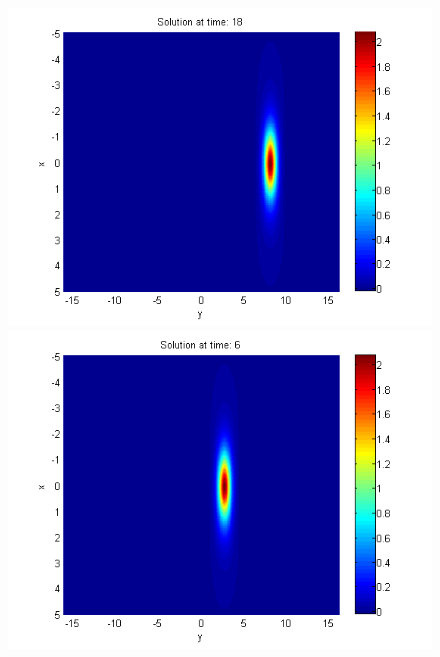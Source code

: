 \documentclass[a4paper]{article}
\theoremstyle{remark}
\begin{document}
\begin{large}
\begin{figure}[ht]
\begin{minipage}[b]{0.48\linewidth}
	\end{minipage}	
	\begin{minipage}[b]{0.48\linewidth}
		\raggedright
		\includegraphics[width=\linewidth]{../amitans/figures/solution_30x45_bt3_c045_T18.png}
	\end{minipage}	
	\begin{minipage}[b]{0.48\linewidth}
		\raggedleft
		\includegraphics[width=\linewidth]{../amitans/figures/solution_30x45_bt3_c045_T6.png}
	\end{minipage}
	\begin{minipage}[b]{0.48\linewidth}
		\raggedright			

\end{minipage}
\end{figure}
\end{large}
\end{document}
